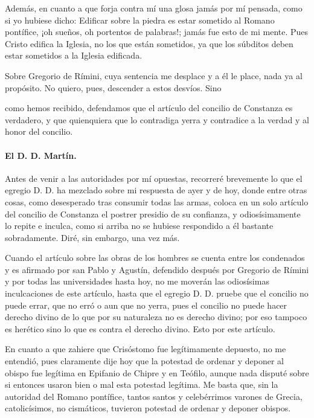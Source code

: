 Además, en cuanto a que forja contra mí una glosa jamás por mí pensada, como si yo hubiese dicho: Edificar sobre la piedra es estar sometido al Romano pontífice, ¡oh sueños, oh portentos de palabras!; jamás fue esto de mi mente. Pues Cristo edifica la Iglesia, no los que están sometidos, ya que los súbditos deben estar sometidos a la Iglesia edificada.

Sobre Gregorio de Rímini, cuya sentencia me desplace y a él le place, nada ya al propósito. No quiero, pues, descender a estos desvíos. Sino

como hemos recibido, defendamos que el artículo del concilio de Constanza es verdadero, y que quienquiera que lo contradiga yerra y contradice a la verdad y al honor del concilio.

\paragraph*{El D. D. Martín.}

Antes de venir a las autoridades por mí opuestas, recorreré brevemente lo que el egregio D. D. ha mezclado sobre mi respuesta de ayer y de hoy, donde entre otras cosas, como desesperado tras consumir todas las armas, coloca en un solo artículo del concilio de Constanza el postrer presidio de su confianza, y odiosísimamente lo repite e inculca, como si arriba no se hubiese respondido a él bastante sobradamente. Diré, sin embargo, una vez más.

Cuando el artículo sobre las obras de los hombres se cuenta entre los condenados y es afirmado por san Pablo y Agustín, defendido después por Gregorio de Rímini y por todas las universidades hasta hoy, no me moverán las odiosísimas inculcaciones de este artículo, hasta que el egregio D. D. pruebe que el concilio no puede errar, que no erró o aun que no yerra, pues el concilio no puede hacer derecho divino de lo que por su naturaleza no es derecho divino; por eso tampoco es herético sino lo que es contra el derecho divino. Esto por este artículo.

En cuanto a que zahiere que Crisóstomo fue legítimamente depuesto, no me entendió, pues claramente dije hoy que la potestad de ordenar y deponer al obispo fue legítima en Epifanio de Chipre y en Teófilo, aunque nada disputé sobre si entonces usaron bien o mal esta potestad legítima. Me basta que, sin \marginpar{\small[309]} la autoridad del Romano pontífice, tantos santos y celebérrimos varones de Grecia, catolicísimos, no cismáticos, tuvieron potestad de ordenar y deponer obispos.

